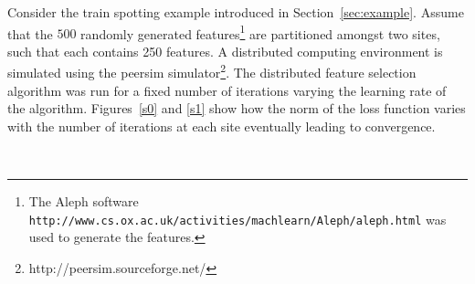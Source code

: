  Consider the train spotting example introduced in Section~\ref{sec:example}. Assume that the $500$ randomly generated features\footnote{The Aleph software \texttt{http://www.cs.ox.ac.uk/activities/machlearn/Aleph/aleph.html} was used to generate the features.} are partitioned amongst two sites, such that each contains 250 features. A distributed computing environment is simulated using the peersim simulator\footnote{http://peersim.sourceforge.net/}. The distributed feature selection algorithm was run for a fixed number of iterations varying the learning rate of the algorithm. Figures~\ref{s0} and \ref{s1} show how the norm of the loss function varies with the number of iterations at each site eventually leading to convergence. 
\begin{figure}[h]
\centerline
{
\\
}
\end{figure}

